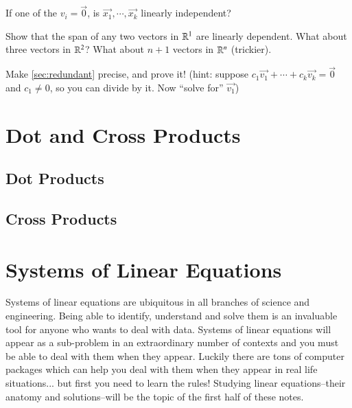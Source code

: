 \documentclass[Main.tex]{subfiles}
\begin{document}
\begin{UnimpEx}
  If one of the $v_i=\vec{0}$, is $\vec{x_1},\cdots,\vec{x_k}$ linearly independent?  
\end{UnimpEx}

\begin{Ex}
  Show that the span of any two vectors in $\mathbb{R}^1$ are linearly dependent.
  What about three vectors in $\mathbb{R}^2$?
  What about $n+1$ vectors in $\mathbb{R}^n$ (trickier).  
\end{Ex}

\begin{ImpEx}
  Make \ref{sec:redundant} precise, and prove it!
  (hint: suppose $c_1\vec{v_1}+\cdots+c_k\vec{v_k} = \vec{0}$ and $c_1\ne 0$, so you can divide by it.  Now ``solve for'' $\vec{v_1}$)
\end{ImpEx}

\exersisesc

\section{Dot and Cross Products}

\subsection{Dot Products}

\subsection{Cross Products}

\begin{Ex}
  \label{sec:crossprodisarea}
\end{Ex}

\exersisesd

\section{Systems of Linear Equations}

Systems of linear equations are ubiquitous in all branches of science and engineering.
Being able to identify, understand and solve them is an invaluable tool for anyone who wants to deal with data.
Systems of linear equations will appear as a sub-problem in an extraordinary number of contexts and you must be able to deal with them when they appear.
Luckily there are tons of computer packages which can help you deal with them when they appear in real life situations... but first you need to learn the rules!
Studying linear equations--their anatomy and solutions--will be the topic of the first half of these notes.
\end{document}
